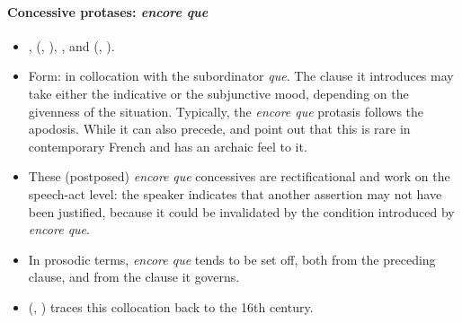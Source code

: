 \paragraph{Concessive protases: \textit{encore que}}\largerpage
\label{appendixFrenchEncoreConcessiveAntecedent}
\begin{itemize}
	\item \textcite[s.v. \textit{encore}]{Dicctionnaire},  \citeauthor{MosegaardHansen2002} (\citeyear{MosegaardHansen2002}, \citeyear[192–197]{MosegaardHansen2008}), \textcite{Morel1996}, and \citeauthor{VictorriFuchs1992} (\citeyear{VictorriFuchs1992}, \citeyear{VictorriFuchs1996}).
	\item Form: in collocation with the subordinator \textit{que}. The clause it introduces may take either the indicative or the subjunctive mood, depending on the givenness of the situation. Typically, the \textit{encore que} protasis follows the apodosis. While it can also precede, \textcite[24]{Morel1996} and \textcite[195]{MosegaardHansen2008} point out that this is rare in contemporary French and has an archaic feel to it.
	\item These (postposed) \textit{encore} \textit{que} concessives are rectificational and work on the speech-act level: the speaker indicates that another assertion may not have been justified, because it could be invalidated by the condition introduced by \textit{encore que}. 
	\item In prosodic terms, \textit{encore que} tends to be set off, both from the preceding clause, and from the clause it governs.
	\item \citeauthor{MosegaardHansen2002} (\citeyear{MosegaardHansen2002}, \citeyear[193–197]{MosegaardHansen2008}) traces this collocation back to the 16th century.
\end{itemize}
